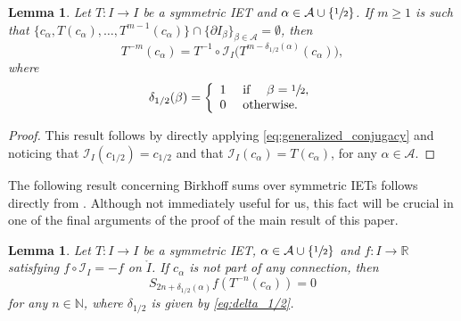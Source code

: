\documentclass[JEP,XML,SOM,Unicode,NoEqCountersInSection,NoFloatCountersInSection,published]{cedram}
\theoremstyle{plain}
\newtheorem{lemma}[theorem]{Lemma}
\theoremstyle{definition}
\newcommand{\A}{\mathcal{A}}
\newcommand{\I}{\mathcal{I}}
\newcommand{\N}{\mathbb{N}}
\newcommand{\R}{\mathbb{R}}
\begin{document}
\begin{lemma}
\label{lem:inverse_iterates}
Let $T: I \to I$ be a symmetric IET and $\alpha \in \A \cup \{\sfrac{1}{2}\}$. If $m \geq 1$ is such that $\{c_\alpha, T(c_\alpha), \ldots, T^{m - 1}(c_\alpha)\} \cap \{\partial I_\beta\}_{\beta \in \A} = \emptyset$, then\vspace*{-3pt}
\begin{equation}
\label{eq:inverse_iterates}
T^{-m}(c_\alpha) =
{T^{-1} \circ \I_I} \big( T^{m - \delta_{1/2}(\alpha)}(c_\alpha) \big),
\end{equation}
where\vspace*{-3pt}
\begin{equation}
\label{eq:delta_1/2}
\delta_{1/2}(\beta) = \left\{\begin{array}{ll} 1 & \text{ if } \quad \beta = \sfrac{1}{2}, \\
0 & \text{ otherwise}.
\end{array} \right.
\end{equation}
\end{lemma}

\begin{proof}
This result follows by directly applying \eqref{eq:generalized_conjugacy} and noticing that $\I_I(c_{1/2}) = c_{1/2}$ and that $\I_I(c_\alpha) = T(c_\alpha)$, for any $\alpha \in \A$.
\end{proof}

The following result concerning Birkhoff sums over symmetric IETs follows
directly from \cite[Lem.\,3.11]{berk_ergodicity_2023}. Although not
immediately useful for us, this fact will be crucial in one of the final
arguments of the proof of the main result of this paper.
\begin{lemma}\label{lem: berktrujillo}
Let $T: I \to I$ be a symmetric IET, $\alpha \in \A \cup\{\sfrac{1}{2}\}$ and $f : I\to \R$ satisfying $f\circ \I_I=-f$ on $\mathring I$. If $c_{\alpha}$ is not part of any connection, then\vspace*{-3pt}
\[
S_{2n + \delta_{1/2}(\alpha)}f(T^{-n}(c_{\alpha})) = 0
\]
for any $n\in\N$, where $\delta_{1/2}$ is given by \eqref{eq:delta_1/2}.
\end{lemma}
\end{document}
